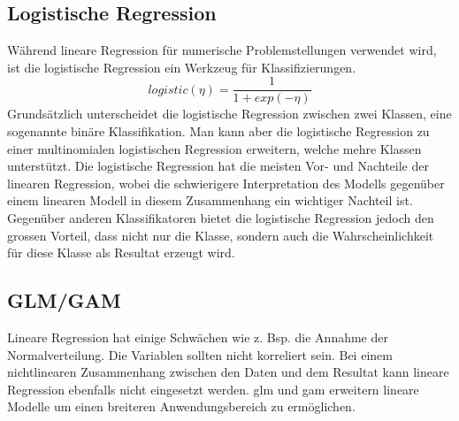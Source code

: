 \documentclass[
  12pt, %
  a4paper, %
  oneside, %
  openany, 
  numbers=noenddot, %
  BCOR=5mm, %
  parskip=half*, %
  thesis, %
]{bfhbook}
\begin{document}
\subsection{Logistische Regression}
\label{logR}
Während lineare Regression für numerische Problemstellungen verwendet wird, ist die logistische Regression ein Werkzeug für Klassifizierungen.
\[logistic(\eta)=\frac{1}{1+exp(-\eta)}\]
Grundsätzlich unterscheidet die logistische Regression zwischen zwei Klassen, eine sogenannte binäre Klassifikation. Man kann aber die logistische Regression zu einer  multinomialen logistischen Regression erweitern, welche mehre Klassen unterstützt.
Die logistische Regression hat die meisten Vor- und Nachteile der linearen Regression, wobei die schwierigere Interpretation des Modells gegenüber einem linearen Modell in diesem Zusammenhang ein wichtiger Nachteil ist. Gegenüber anderen Klassifikatoren bietet die logistische Regression jedoch den grossen Vorteil, dass nicht nur die Klasse, sondern auch die Wahrscheinlichkeit für diese Klasse als Resultat erzeugt wird.
\subsection{GLM/GAM}
\label{gam}
Lineare Regression hat einige Schwächen wie z. Bsp. die Annahme der Normalverteilung. Die Variablen sollten nicht korreliert sein. Bei einem nichtlinearen Zusammenhang zwischen den Daten und dem Resultat kann lineare Regression ebenfalls nicht eingesetzt werden. \acrfull{glm} und \acrfull{gam} erweitern lineare Modelle um einen breiteren Anwendungsbereich zu ermöglichen.
\end{document}
